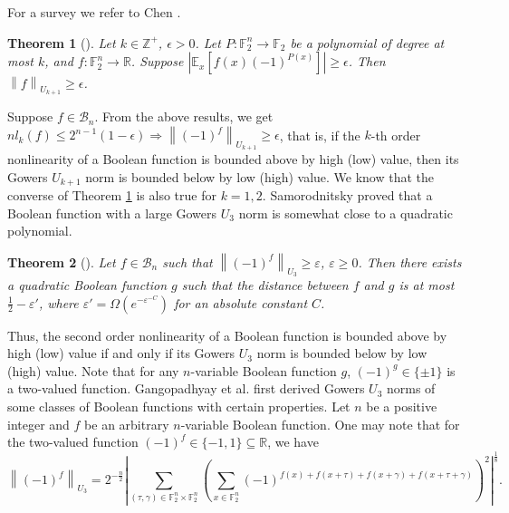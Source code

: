 \documentclass[12 pt]{article}
\newtheorem{theorem}{Theorem}
\def\F{{\mathbb F}}
\begin{document}
  For a survey we refer to Chen \cite{CHEN}.
  \begin{theorem}[{\cite{CHEN,GOW01,GT06}}]\label{direct}
    Let $k\in\mathbb{Z}^+$, $\epsilon>0$. 
    Let $P:\F_2^n\rightarrow\F_2$ be a polynomial of degree at most $k$, and $f:\F_2^n\rightarrow\mathbb{R}$. 
    Suppose $\left\lvert \mathbb{E}_{x}\left[f(x)(-1)^{P(x)}\right] \right\rvert\ge\epsilon$. 
    Then $\left\lVert f \right\rVert_{U_{k+1}} \ge\epsilon$.
  \end{theorem}
  Suppose $f\in\mathcal{B}_n$. From the above results, we get $nl_k(f)\le 2^{n-1}(1-\epsilon)\Rightarrow\left\lVert(-1)^f\right\rVert_{U_{k+1}} \ge\epsilon$, that is, if the $k$-th order nonlinearity of a Boolean function is bounded above by high (low) value, then its Gowers $U_{k+1}$ norm is bounded below by low (high) value. 
  We know \cite{GT06,SamSTOCy07} that the converse of Theorem \ref{direct} is also true for $k=1,2$. 
  Samorodnitsky \cite{SamSTOCy07} proved that a Boolean function with a large Gowers $U_3$ norm is somewhat close to a quadratic polynomial.
  \begin{theorem}[{\cite[Theorem 2.3]{SamSTOCy07}}]\label{inverse-2nd}
    Let $f\in\mathcal{B}_n$ such that $\left\lVert(-1)^f\right\rVert_{U_3}\ge\varepsilon$, $\varepsilon\ge 0$. 
    Then there exists a quadratic Boolean function $g$ such that the distance between $f$ and $g$ is at most $\frac{1}{2}-\varepsilon'$, where $\varepsilon'=\Omega(e^{-{\varepsilon^{-C}}})$ for an absolute constant $C$.
  \end{theorem}
  Thus, the second order nonlinearity of a Boolean function is bounded above by high (low) value if and only if its Gowers $U_{3}$ norm is bounded below by low (high) value. 
  Note that for any $n$-variable Boolean function $g$, $(-1)^{g}\in\{\pm 1\}$ is a two-valued function. 
  Gangopadhyay et al. \cite{GMS18} first derived Gowers $U_3$ norms of some classes of Boolean functions with certain properties. 
  Let $n$ be a positive integer and $f$ be an arbitrary $n$-variable Boolean function. 
  One may note that for the two-valued function $(-1)^f\in\{-1,1\}\subseteq\mathbb{R}$, we have
  \begin{equation}\label{L:U3}
    \left\lVert (-1)^{f} \right\rVert_{U_3}=2^{-{\frac{n}{2}}}\left\lvert\sum_{(\tau,\gamma)\in\F_2^n\times\F_2^n}\left(\sum_{x\in\F_2^n}(-1)^{f(x)+f(x+\tau)+f(x+\gamma)+f(x+\tau+\gamma)}\right)^2\right\rvert^{\frac{1}{8}}.
  \end{equation}
\end{document}
